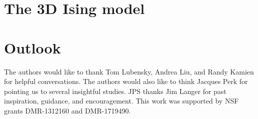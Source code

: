 \documentclass[
  aps,
  prb,
  reprint,
  longbibliography,
  floatfix
]{revtex4-2}
\begin{document}
\section{The 3D Ising model}

\section{Outlook}

\begin{acknowledgments}
  The authors would like to thank Tom Lubensky, Andrea Liu, and Randy Kamien
  for helpful conversations. The authors would also like to think Jacques Perk
  for pointing us to several insightful studies. JPS thanks Jim Langer for past
  inspiration, guidance, and encouragement. This work was supported by NSF
  grants DMR-1312160 and DMR-1719490.
\end{acknowledgments}


\end{document}
